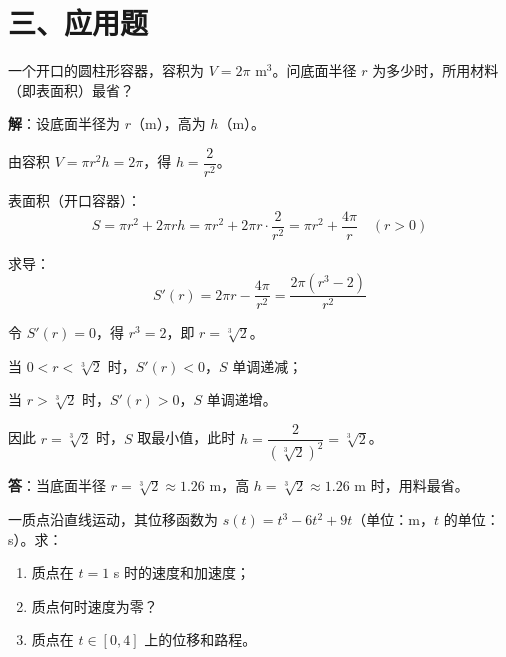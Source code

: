 \documentclass[12pt, a4paper]{ctexart}
\begin{document}
\section*{\textcolor{apppurple}{三、应用题}}

\begin{appbox}[【应用1】用料最省问题]
一个开口的圆柱形容器，容积为 $V = 2\pi \text{ m}^3$。问底面半径 $r$ 为多少时，所用材料（即表面积）最省？
\end{appbox}

\textbf{解}：设底面半径为 $r$（m），高为 $h$（m）。

由容积 $V = \pi r^2 h = 2\pi$，得 $h = \dfrac{2}{r^2}$。

表面积（开口容器）：
\[
S = \pi r^2 + 2\pi r h = \pi r^2 + 2\pi r \cdot \frac{2}{r^2} = \pi r^2 + \frac{4\pi}{r} \quad (r > 0)
\]

求导：
\[
S'(r) = 2\pi r - \frac{4\pi}{r^2} = \frac{2\pi(r^3 - 2)}{r^2}
\]

令 $S'(r) = 0$，得 $r^3 = 2$，即 $r = \sqrt[3]{2}$。

当 $0 < r < \sqrt[3]{2}$ 时，$S'(r) < 0$，$S$ 单调递减；

当 $r > \sqrt[3]{2}$ 时，$S'(r) > 0$，$S$ 单调递增。

因此 $r = \sqrt[3]{2}$ 时，$S$ 取最小值，此时 $h = \dfrac{2}{(\sqrt[3]{2})^2} = \sqrt[3]{2}$。

\textbf{答}：当底面半径 $r = \sqrt[3]{2} \approx 1.26$ m，高 $h = \sqrt[3]{2} \approx 1.26$ m 时，用料最省。

\begin{center}
\end{center}

\begin{appbox}[【应用2】运动学中的速度与加速度]
一质点沿直线运动，其位移函数为 $s(t) = t^3 - 6t^2 + 9t$（单位：m，$t$ 的单位：s）。求：
\begin{enumerate}[leftmargin=2em]
  \item 质点在 $t = 1$ s 时的速度和加速度；
  \item 质点何时速度为零？
  \item 质点在 $t \in [0, 4]$ 上的位移和路程。
\end{enumerate}
\end{appbox}
\end{document}
